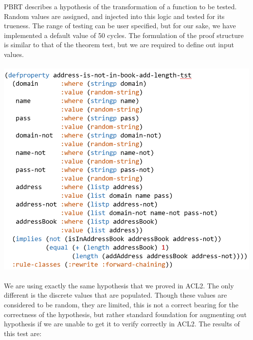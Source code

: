 \documentclass[11pt, letterpaper]{report}
\begin{document}
\begin{description}
PBRT describes a hypothesis of the transformation of a function to be tested.  Random values are assigned, and injected into this logic and tested for its trueness.  The range of testing can be user specified, but for our sake, we have implemented a default value of 50 cycles.  The formulation of the proof structure is similar to that of the theorem test, but we are required to define out input values.
\\\\
\includegraphics[scale=.4]{pbrt}\\\\ 
We are using exactly the same hypothesis that we proved in ACL2.  The only different is the discrete values that are populated.  Though these values are considered to be random, they are limited, this is not a correct bearing for the correctness of the hypothesis, but rather standard foundation for augmenting out hypothesis if we are unable to get it to verify correctly in ACL2.  The results of this test are: 
\begin{center}

\end{center}
\end{description}
\end{document}

